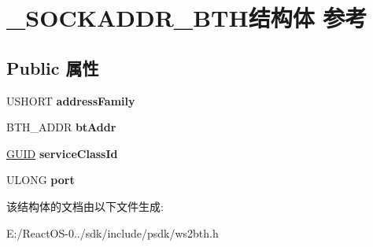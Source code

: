 \hypertarget{struct___s_o_c_k_a_d_d_r___b_t_h}{}\section{\+\_\+\+S\+O\+C\+K\+A\+D\+D\+R\+\_\+\+B\+T\+H结构体 参考}
\label{struct___s_o_c_k_a_d_d_r___b_t_h}
\subsection*{Public 属性}
\begin{DoxyCompactItemize}
\item 
\mbox{\label{struct___s_o_c_k_a_d_d_r___b_t_h_a7113ef40f9caffe5cb0eba0d094a77f7}} 
U\+S\+H\+O\+RT {\bfseries address\+Family}
\item 
\mbox{\label{struct___s_o_c_k_a_d_d_r___b_t_h_aaf82da3efce104268d383f322ec559af}} 
B\+T\+H\+\_\+\+A\+D\+DR {\bfseries bt\+Addr}
\item 
\mbox{\label{struct___s_o_c_k_a_d_d_r___b_t_h_ab8f77f5a0f5b8fa5ca7c98a9850696ac}} 
\hyperlink{interface_g_u_i_d}{G\+U\+ID} {\bfseries service\+Class\+Id}
\item 
\mbox{\label{struct___s_o_c_k_a_d_d_r___b_t_h_ae3606220dafcab24974a821e4f57581f}} 
U\+L\+O\+NG {\bfseries port}
\end{DoxyCompactItemize}


该结构体的文档由以下文件生成\+:\begin{DoxyCompactItemize}
\item 
E\+:/\+React\+O\+S-\/0../sdk/include/psdk/ws2bth.\+h\end{DoxyCompactItemize}
